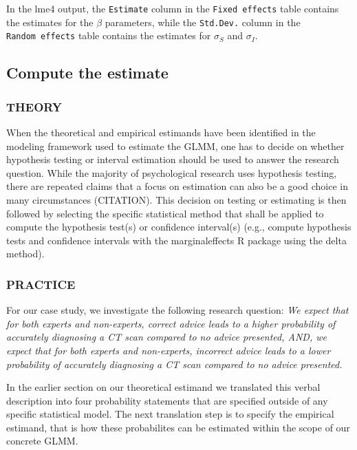 \documentclass[
  man,floatsintext]{apa6}
\begin{document}
In the lme4 output, the \texttt{Estimate} column in the \texttt{Fixed\ effects} table contains the estimates for the \(\beta\) parameters, while the \texttt{Std.Dev.} column in the \texttt{Random\ effects} table contains the estimates for \(\sigma_S\) and \(\sigma_I\).

\hypertarget{compute-the-estimate}{%
\subsection{Compute the estimate}\label{compute-the-estimate}}

\hypertarget{theory-7}{%
\subsubsection{THEORY}\label{theory-7}}

When the theoretical and empirical estimands have been identified in the modeling framework used to estimate the GLMM, one has to decide on whether hypothesis testing or interval estimation should be used to answer the research question.
While the majority of psychological research uses hypothesis testing, there are repeated claims that a focus on estimation can also be a good choice in many circumstances (CITATION).
This decision on testing or estimating is then followed by selecting the specific statistical method that shall be applied to compute the hypothesis test(s) or confidence interval(s) (e.g., compute hypothesis tests and confidence intervals with the marginaleffects R package using the delta method).

\hypertarget{practice-7}{%
\subsubsection{PRACTICE}\label{practice-7}}

For our case study, we investigate the following research question:
\emph{We expect that for both experts and non-experts, correct advice leads to a higher probability of accurately diagnosing a CT scan compared to no advice presented, AND, we expect that for both experts and non-experts, incorrect advice leads to a lower probability of accurately diagnosing a CT scan compared to no advice presented.}

In the earlier section on our theoretical estimand we translated this verbal description into four probability statements that are specified outside of any specific statistical model.
The next translation step is to specify the empirical estimand, that is how these probabilites can be estimated within the scope of our concrete GLMM.
\end{document}
